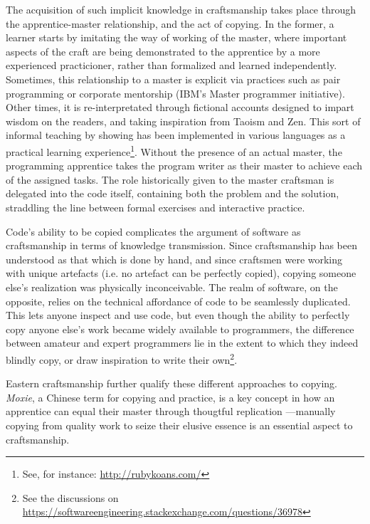 \documentclass{article}
\begin{document}
The acquisition of such implicit knowledge in craftsmanship takes place through the apprentice-master relationship, and the act of copying. In the former, a learner starts by imitating the way of working of the master, where important aspects of the craft are being demonstrated to the apprentice by a more experienced practicioner, rather than formalized and learned independently. Sometimes, this relationship to a master is explicit via practices such as pair programming\cite{williams_pair_2003} or corporate mentorship (IBM's Master programmer initiative). Other times, it is re-interpretated through fictional accounts designed to impart wisdom on the readers, and taking inspiration from Taoism and Zen\cite{james_tao_1987}. This sort of informal teaching by showing has been implemented in various languages as a practical learning experience\footnote{See, for instance: \url{http://rubykoans.com/}}. Without the presence of an actual master, the programming apprentice takes the program writer as their master to achieve each of the assigned tasks. The role historically given to the master craftsman is delegated into the code itself, containing both the problem and the solution, straddling the line between formal exercises and interactive practice.

Code's ability to be copied complicates the argument of software as craftsmanship in terms of knowledge transmission. Since craftsmanship has been understood as that which is done by hand, and since craftsmen were working with unique artefacts (i.e. no artefact can be perfectly copied), copying someone else's realization was physically inconceivable. The realm of software, on the opposite, relies on the technical affordance of code to be seamlessly duplicated\cite{manovich_language_2001}. This lets anyone inspect and use code, but even though the ability to perfectly copy anyone else's work became widely available to programmers, the difference between amateur and expert programmers lie in the extent to which they indeed blindly copy, or draw inspiration to write their own\cite{treude_understanding_2017}\footnote{See the discussions on \url{https://softwareengineering.stackexchange.com/questions/36978}}.

Eastern craftsmanship further qualify these different approaches to copying. \emph{Moxie}, a Chinese term for copying and practice, is a key concept in how an apprentice can equal their master through thougtful replication \cite{man_influence_2015,jordan_copying_2003}---manually copying from quality work to seize their elusive essence is an essential aspect to craftsmanship.
\end{document}
